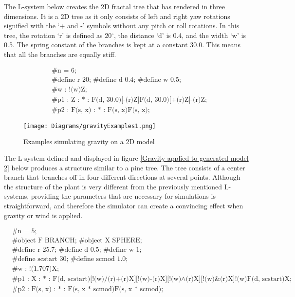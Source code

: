 \noindent
The L-system below creates the 2D fractal tree that has rendered in three dimensions. It is a 2D tree as it only consists of left and right yaw rotations signified with the `+ and -' symbols without any pitch or roll rotations. In this tree, the rotation `r' is defined as 20$^{\circ}$, the distance `d' is 0.4, and the width `w' is 0.5. The spring constant of the branches is kept at a constant 30.0. This means that all the branches are equally stiff. 

\begin{singlespace}
\begin{equation} \label{2d L-system physics}
\begin{aligned}
	&\textrm{\#n = 6;} \\
	&\textrm{\#define r 20; \#define d 0.4; \#define w 0.5;}\\
	&\textrm{\#w : !(w)Z;}\\
	&\textrm{\#p1 : Z : * : F(d, 30.0)[-(r)Z]F(d, 30.0)[+(r)Z]-(r)Z;}\\
	&\textrm{\#p2 : F(s, x) : * : F(s, x)F(s, x);}
\end{aligned}
\end{equation}
\end{singlespace}

\begin{figure}[htbp]
	{\centering
		\vspace{7px}
		\texttt{[image: Diagrams/gravityExamples1.png]}
		\label{3DAxisFigure}
		\caption{Examples simulating gravity on a 2D model}  \label{Gravity applied to generated model 1}
	}
\end{figure}
\FloatBarrier

\noindent
The L-system defined and displayed in figure \ref{Gravity applied to generated model 2} below produces a structure similar to a pine tree. The tree consists of a center branch that branches off in four different directions at several points. Although the structure of the plant is very different from the previously mentioned L-systems, providing the parameters that are necessary for simulations is straightforward, and therefore the simulator can create a convincing effect when gravity or wind is applied. 

\begin{singlespace}
\begin{equation}
\begin{aligned}
	&\textrm{\#n = 5;} \\
	&\textrm{\#object F BRANCH; \#object X SPHERE;}\\
	&\textrm{\#define r 25.7; \#define d 0.5; \#define w 1;}\\
	&\textrm{\#define scstart 30; \#define scmod 1.0;}\\
	&\textrm{\#w : !(1.707)X;}\\
	&\textrm{\#p1 : X : * : F(d, scstart)[!(w)/(r)+(r)X][!(w)-(r)X][!(w)$\land$(r)X][!(w)\&(r)X]!(w)F(d, scstart)X;}\\
	&\textrm{\#p2 : F(s, x) : * : F(s, x * scmod)F(s, x * scmod);}
\end{aligned}
\end{equation}
\end{singlespace}


